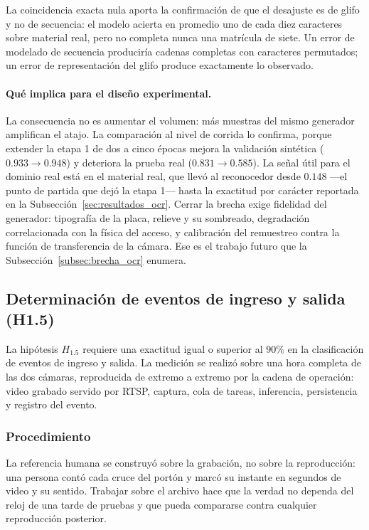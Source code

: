La coincidencia exacta nula aporta la confirmación de que el desajuste es de
glifo y no de secuencia: el modelo acierta en promedio uno de cada diez caracteres
sobre material real, pero no completa nunca una matrícula de siete. Un error de
modelado de secuencia produciría cadenas completas con caracteres permutados; un
error de representación del glifo produce exactamente lo observado.

\paragraph{Qué implica para el diseño experimental.}
La consecuencia no es aumentar el volumen: más muestras del mismo generador
amplifican el atajo. La comparación al nivel de corrida lo confirma, porque
extender la etapa 1 de dos a cinco épocas mejora la validación sintética
($0{.}933 \rightarrow 0{.}948$) y deteriora la prueba real
($0{.}831 \rightarrow 0{.}585$). La señal útil para el dominio real está en el
material real, que llevó al reconocedor desde $0{.}148$ ---el punto de partida que
dejó la etapa 1--- hasta la exactitud por carácter reportada en la
Subsección~\ref{sec:resultados_ocr}. Cerrar la brecha exige fidelidad del
generador: tipografía de la placa, relieve y su sombreado, degradación
correlacionada con la física del acceso, y calibración del remuestreo contra la
función de transferencia de la cámara. Ese es el trabajo futuro que la
Subsección~\ref{subsec:brecha_ocr} enumera.

\subsection{Determinación de eventos de ingreso y salida (H1.5)}
\label{sec:resultados_eventos}

La hipótesis $H_{1{.}5}$ requiere una exactitud igual o superior al $90\%$ en la
clasificación de eventos de ingreso y salida. La medición se realizó sobre una
hora completa de las dos cámaras, reproducida de extremo a extremo por la cadena
de operación: video grabado servido por RTSP, captura, cola de tareas, inferencia,
persistencia y registro del evento.

\subsubsection{Procedimiento}

La referencia humana se construyó sobre la grabación, no sobre la reproducción:
una persona contó cada cruce del portón y marcó su instante en segundos de video y
su sentido. Trabajar sobre el archivo hace que la verdad no dependa del reloj de
una tarde de pruebas y que pueda compararse contra cualquier reproducción
posterior.

